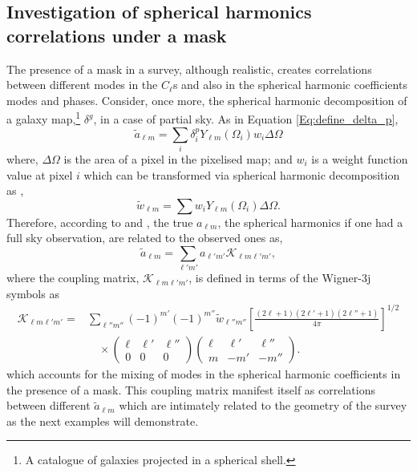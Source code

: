\subsection{Investigation of spherical harmonics correlations under a mask}\label{Sec:BPL:AlmsInvestigation}
The presence of a mask in a survey, although realistic, creates correlations between different modes in the $C_{\ell}$s and also in the spherical harmonic coefficients modes and phases. Consider, once more, the spherical harmonic decomposition of a galaxy map,\footnote{A catalogue of galaxies projected in a spherical shell.} $\delta^g$, in a case of partial sky. As in Equation \eqref{Eq:define_delta_p},
\begin{equation}
    \tilde{a}_{\ell m} = \sum_i \delta^p_i Y_{\ell m}(\Omega_i)w_i\Delta\Omega
\end{equation}
where, $\Delta\Omega$ is the area of a pixel in the pixelised map; and $w_i$ is a weight function value at pixel $i$ which can be transformed via spherical harmonic decomposition as \citep{Efstat2004},
\begin{equation}
    \tilde{w}_{\ell m} = \sum w_i Y_{\ell m}(\Omega_i)\Delta\Omega.
\end{equation}
Therefore, according to \cite{PolSpice2001} and \cite{Efstat2004}, the true $a_{\ell m}$, the spherical harmonics if one had a full sky observation, are related to the observed ones as,
\begin{equation}
    \tilde{a}_{\ell m} = \sum_{\ell' m'} a_{\ell' m'}\mathcal{K}_{\ell m \ell' m'}, 
\end{equation}
where the coupling matrix, $\mathcal{K}_{\ell m \ell' m'}$, is defined in terms of the Wigner-3j symbols as
\begin{align}
\label{Eq:Klmlm}
    \mathcal{K}_{\ell m \ell' m'} = & \sum_{\ell'' m''} (-1)^{m'}(-1)^{m''} \tilde{w}_{\ell'' m''} \left[\frac{(2\ell + 1)(2\ell'+1)(2\ell''+1)}{4\pi} \right]^{1/2} \nonumber \\
    & \quad \times \begin{pmatrix} \ell & \ell' & \ell'' \\ 0 & 0 & 0 \end{pmatrix}\begin{pmatrix} \ell & \ell' & \ell'' \\ m & -m' & -m'' \end{pmatrix}.
\end{align}
which accounts for the mixing of modes in the spherical harmonic coefficients in the presence of a mask. This coupling matrix manifest itself as correlations between different $\tilde{a}_{\ell m}$ which are intimately related to the geometry of the survey as the next examples will demonstrate.

